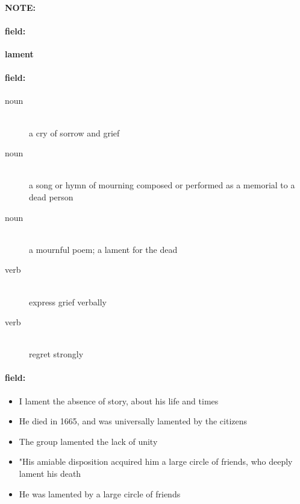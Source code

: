 \documentclass[12pt]{article}
\newenvironment{note}{\paragraph{NOTE:}}{}
\newenvironment{field}{\paragraph{field:}}{}
\begin{document}
\begin{note}
\begin{field}
\textbf{\large lament}
\end{field}


\begin{field}
\begin{description}
\item[noun] \hfill \\ 
a cry of sorrow and grief

\item[noun] \hfill \\ 
a song or hymn of mourning composed or performed as a memorial to a dead person

\item[noun] \hfill \\ 
a mournful poem; a lament for the dead

\item[verb] \hfill \\ 
express grief verbally

\item[verb] \hfill \\ 
regret strongly

\end{description}
\end{field}

\begin{field}
\begin{itemize}
\item I lament the absence of story, about his life and times
\item He died in 1665, and was universally lamented by the citizens
\item The group lamented the lack of unity
\item "His amiable disposition acquired him a large circle of friends, who deeply lament his death
\item He was lamented by a large circle of friends
\end{itemize}
\end{field}
\end{note}
\end{document}
